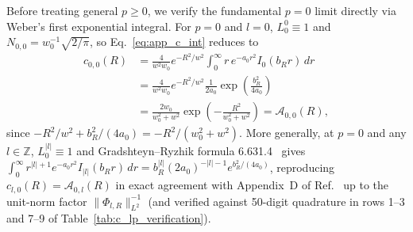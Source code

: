 \documentclass[aps,pra,reprint,nofootinbib,floatfix,longbibliography]{revtex4-2}
\theoremstyle{remark}
\newcommand{\norm}[1]{\lVert #1 \rVert}
\newcommand{\abs}[1]{\lvert #1 \rvert}
\begin{document}
Before treating general $p \ge 0$, we verify the fundamental $p = 0$ limit directly via Weber's first exponential integral. For $p = 0$ and $l = 0$, $L_0^0 \equiv 1$ and $N_{0,0} = w_0^{-1}\sqrt{2/\pi}$, so Eq.~\eqref{eq:app_c_int} reduces to
\begin{align}
c_{0,0}(R) &= \frac{4}{w^2 w_0} e^{-R^2/w^2} \int_0^\infty r\,e^{-a_0 r^2} I_0(b_R r)\,dr \nonumber \\
&= \frac{4}{w^2 w_0} e^{-R^2/w^2} \frac{1}{2a_0} \exp\!\left(\frac{b_R^2}{4a_0}\right) \nonumber \\
&= \frac{2w_0}{w_0^2 + w^2} \exp\!\left(-\frac{R^2}{w_0^2 + w^2}\right) = \mathcal{A}_{0,0}(R),
\label{eq:app_p0_l0_check}
\end{align}
since $-R^2/w^2 + b_R^2/(4a_0) = -R^2/(w_0^2 + w^2)$. More generally, at $p = 0$ and any $l \in \mathbb{Z}$, $L_0^{\abs{l}} \equiv 1$ and Gradshteyn--Ryzhik formula 6.631.4~\cite{Gradshteyn2014} gives $\int_0^\infty r^{\abs{l}+1} e^{-a_0 r^2} I_{\abs{l}}(b_R r)\,dr = b_R^{\abs{l}} (2 a_0)^{-\abs{l}-1} e^{b_R^2/(4a_0)}$, reproducing $c_{l,0}(R) = \mathcal{A}_{0,l}(R)$ in exact agreement with Appendix~D of Ref.~\cite{Ferreira2026} up to the unit-norm factor $\norm{\Phi_{l,R}}_{L^2}^{-1}$ (and verified against 50-digit quadrature in rows 1--3 and 7--9 of Table~\ref{tab:c_lp_verification}).
\end{document}
